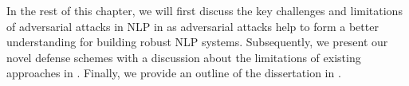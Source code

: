 In the rest of this chapter, we will first discuss the key challenges and limitations of adversarial attacks in NLP in  as adversarial attacks help to form a better understanding for building robust NLP systems. Subsequently, we present our novel defense schemes with a discussion about the limitations of existing approaches in . Finally, we provide an outline of the dissertation in . 

